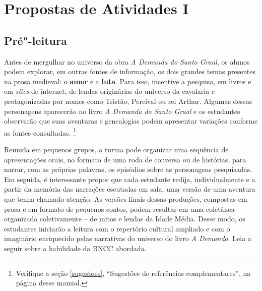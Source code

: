\documentclass[11pt]{extarticle}
\begin{document}
\pagebreak
\tableofcontents


\section{Propostas de Atividades I}



\subsection{Pré"-leitura}



Antes de mergulhar no universo da obra \emph{A Demanda do Santo
Graal}, os alunos podem explorar, em outras fontes de informação, os
dois grandes temas presentes na prosa medieval: o \textbf{amor} e a
\textbf{luta}. Para isso, incentive a pesquisa, em livros e em
\emph{sites} de internet, de lendas originárias do universo da cavalaria
e protagonizadas por nomes como Tristão, Percival ou rei Arthur. Algumas
dessas personagens aparecerão no livro \emph{A Demanda do Santo Graal} e os
estudantes observarão que suas aventuras e genealogias podem apresentar
variações conforme as fontes consultadas. \footnote{Verifique 
  a seção \ref{sugestoes}, ``Sugestões de referências complementares'', 
  na página \pageref{sugestoes} desse manual.}


  

Reunida em pequenos grupos, a
turma pode organizar uma sequência de apresentações orais, no formato de
uma roda de conversa ou de histórias, para narrar, com as
próprias palavras, os episódios sobre as personagens pesquisadas. Em
seguida, é interessante propor que cada estudante redija,
individualmente e a partir da memória das narrações escutadas em sala,
uma versão de uma aventura que tenha chamado atenção. As versões finais
dessas produções, compostas em prosa e em formato de pequenos contos,
podem resultar em uma coletânea -- organizada coletivamente -- de mitos
e lendas da Idade Média. Desse modo, os estudantes iniciarão a leitura
com o repertório cultural ampliado e com o imaginário enriquecido pelas
narrativas do universo do livro \emph{A Demanda}.
Leia a seguir sobre a habilidade da BNCC abordada.
\end{document}
